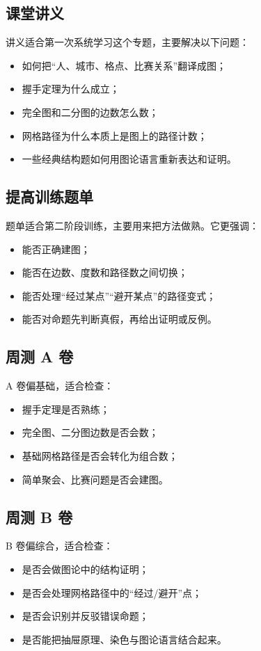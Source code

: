 \documentclass[11pt,a4paper,fontset=fandol]{ctexart}
\begin{document}
\subsection{课堂讲义}
讲义适合第一次系统学习这个专题，主要解决以下问题：
\begin{itemize}
  \item 如何把“人、城市、格点、比赛关系”翻译成图；
  \item 握手定理为什么成立；
  \item 完全图和二分图的边数怎么数；
  \item 网格路径为什么本质上是图上的路径计数；
  \item 一些经典结构题如何用图论语言重新表达和证明。
\end{itemize}

\subsection{提高训练题单}
题单适合第二阶段训练，主要用来把方法做熟。它更强调：
\begin{itemize}
  \item 能否正确建图；
  \item 能否在边数、度数和路径数之间切换；
  \item 能否处理“经过某点”“避开某点”的路径变式；
  \item 能否对命题先判断真假，再给出证明或反例。
\end{itemize}

\subsection{周测 A 卷}
A 卷偏基础，适合检查：
\begin{itemize}
  \item 握手定理是否熟练；
  \item 完全图、二分图边数是否会数；
  \item 基础网格路径是否会转化为组合数；
  \item 简单聚会、比赛问题是否会建图。
\end{itemize}

\subsection{周测 B 卷}
B 卷偏综合，适合检查：
\begin{itemize}
  \item 是否会做图论中的结构证明；
  \item 是否会处理网格路径中的“经过/避开”点；
  \item 是否会识别并反驳错误命题；
  \item 是否能把抽屉原理、染色与图论语言结合起来。
\end{itemize}
\end{document}
